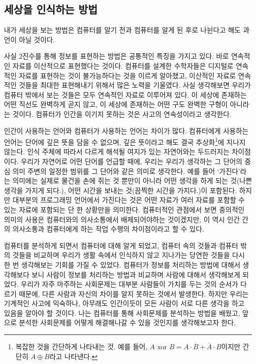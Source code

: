 \documentclass{article}
\begin{document}
\subsection{세상을 인식하는 방법}

내가 세상을 보는 방법은 컴퓨터를 알기 전과 컴퓨터를 알게 된 후로 나뉜다고 해도 과언이 아닐 것이다.

사실 2진수를 통해 정보를 표현하는 방법은 공통적인 특징을 가지고 있다.
바로 연속적인 자료를 이산적으로 표현했다는 것이다.
컴퓨터를 설계한 수학자들은 디지털로 연속적인 자료를 표현하는 것이 불가능하다는 것을 이르게 알아챘고,
이산적인 자료로 연속적인 것들을 최대한 표현해내기 위해서 많은 노력을 기울였다.
사실 생각해보면 우리가 컴퓨터 밖에서 보는 것들은 모두 연속적인 자료로 이루어져 있다.
이 세상에 존재하는 어떤 직선도 완벽하게 곧지 않고,
이 세상에 존재하는 어떤 구도 완벽한 구형이 아니라는 것이다.
컴퓨터가 인간을 이기지 못하는 것은 사고의 연속성이라고 생각한다.

인간이 사용하는 언어와 컴퓨터가 사용하는 언어는 차이가 많다.
컴퓨터에게 사용하는 언어는 단어에 깊은 뜻을 담을 수 없으며, 깊은 뜻이라고 해도 결국
추상화\footnote{복잡한 것을 간단하게 나타내는 것. 예를 들어,
$A \text{ xor } B = A \cdot \overline B + \overline A \cdot B$이지만
간단히 $A \oplus B$라고 나타낸다.}에 지나지 않는다.
인식 주체에 따라서 다르게 해석될 여지가 있는 자연어와는 두드러지는 차이점이다.
우리가 자연어로 어떤 단어를 언급할 때에, 우리는 우리가 생각하는 그 단어의 중심 의미 주변의 일정한
범위를 그 단어와 같은 의미로 생각한다. 예를 들어 `가진다'라는 의미에는 실제로 물건을 손에 쥐는 것
뿐만이 아니라 어떤 생각을 하게 되는 것(나쁜 생각을 가지게 되다.),
어떤 시간을 보내는 것(끔찍한 시간을 가지다.)이 포함된다.
하지만 대부분의 프로그래밍 언어에서 가진다는 것은 어떤 자료가 여러 자료를 포함할 수 있는 자료에
포함되는 단 한 상황만을 의미한다.
컴퓨터적인 관점에서 보면 중의적인 의미의 사용은 컴퓨터와의 의사소통에서 배제되어야하는 것이겠지만,
이 역시 인간 간의 의사소통과 컴퓨터에게 하는 작업 수행의 차이점이라고 할 수 있다.


컴퓨터를 분석하게 되면서 컴퓨터에 대해 알게 되었고, 컴퓨터 속의 것들과 컴퓨터 밖의 것들을 비교하며
우리가 생활 속에서 인식하지 않고 지나가는 당연한 것들을 다시 한 번 생각해보는 기회를 가질 수
있었다.
컴퓨터가 정보를 처리하는 방법에 대해서 생각해보다 보니 사람이 정보를 처리하는 방법과
비교하며 사람에 대해서 생각해보게 되었다.
우리가 자주 마주하는 사회문제는 대부분 사람들이 가치를 두는 것의 순서가 다르기 때문에,
다른 사람과 자신의 차이를 알지 못하는 것에서 발생한다.
하지만 우리는 기계적인 사고에 익숙하나, 아무래도 인간이듯이 모든 사람이 서로 다른 생각을 하고 있음을
알아야 할 것이다.
나는 컴퓨터를 통해 사회문제를 분석하는 방법을 배웠고, 앞으로 분석한 사회문제를 어떻게 해결해나갈
수 있을 것인지를 생각해보고자 한다.
\end{document}
